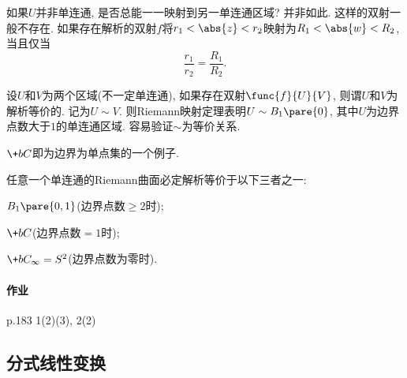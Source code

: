 \documentclass{ctexart}
\begin{document}
\begin{remark}
    如果$U$并非单连通, 是否总能一一映射到另一单连通区域? 并非如此. 这样的双射一般不存在. 如果存在解析的双射$f$将$r_1<\abs{z}<r_2$映射为$R_1<\abs{w}<R_2$, 当且仅当
    \[ \frac{r_1}{r_2} = \frac{R_1}{R_2}. \]
\end{remark}
设$U$和$V$为两个区域(不一定单连通), 如果存在双射$\func{f}{U}{V}$, 则谓$U$和$V$为解析等价的. 记为$U\sim V$. 则Riemann映射定理表明$U\sim B_1\pare{0}$, 其中$U$为边界点数大于$1$的单连通区域. 容易验证$\sim$为等价关系.
\begin{remark}
    $\+bC$即为边界为单点集的一个例子.
\end{remark}
\begin{theorem}
    任意一个单连通的Riemann曲面必定解析等价于以下三者之一:
    \begin{cenum}
        \item $B_1\pare{0,1}$(边界点数$\ge 2$时);
        \item $\+bC$(边界点数$=1$时);
        \item $\+bC_{\infty} = S^2$(边界点数为零时).
    \end{cenum}
\end{theorem}

\paragraph{作业} %
\label{par:作业}

p.183 1(2)(3), 2(2)


\subsection{分式线性变换} %
\label{sub:分式线性变换}
\end{document}

